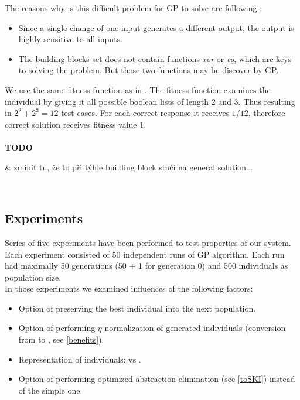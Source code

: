 \documentclass[12pt,a4paper]{report}
\newenvironment{todo}
{ ~\\[0.5em]
  {\color{red}\textbf{TODO}}
  \begin{easylist}[itemize]}
{ \end{easylist}
  ~}
\begin{document}
The reasons why is this difficult problem 
for GP to solve are following \cite{todo}:

\begin{itemize}
 \item Since a single change of one input generates a different output,
       the output is highly sensitive to all inputs.
 \item The building blocks set does not contain functions \textit{xor}
       or \textit{eq}, which are keys to solving the problem.
       But those two functions may be discover by GP.  
\end{itemize}

We use the same fitness function as in \cite{yu01}. 
The fitness function examines the individual by giving
it all possible boolean lists of length 2 and 3.
Thus resulting in $2^2 + 2^3 = 12$ test cases.
For each correct response it receives $1/12$, 
therefore correct solution receives fitness value $1$.\\

\begin{todo}
 & zmínit tu, že to při týhle building block stačí na general solution...
\end{todo}

\subsection{Experiments}

Series of five experiments have been performed to test properties of our system.
Each experiment consisted of 50 independent runs of GP algorithm.
Each run had maximally 50 generations
(50 + 1 for generation 0) and 500 individuals as population size.\\
 
In those experiments we examined influences of the following factors:

\begin{itemize}
 \item Option of preserving the best individual into the next population.
 \item Option of performing $\eta$-normalization of generated individuals 
      (conversion from \lnf to \benf, see \ref{benefits}).
 \item Representation of individuals: \sexprTree vs \atTree.
 \item Option of performing optimized abstraction elimination
       (see \ref{toSKI}) instead of the simple one.
\end{itemize} 
 
\end{document}
